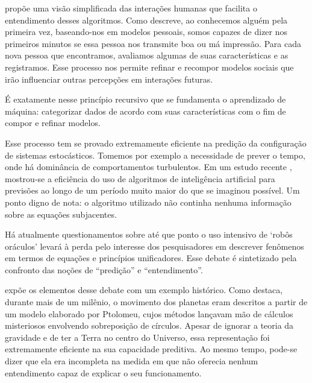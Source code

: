  propõe uma visão simplificada das interações humanas que facilita o entendimento desses algoritmos. Como descreve, ao conhecemos alguém pela primeira vez, baseando-nos em modelos pessoais, somos capazes de dizer nos primeiros minutos se essa pessoa nos transmite boa ou má impressão. Para cada nova pessoa que encontramos, avaliamos algumas de suas características e as registramos. Esse processo nos permite refinar e recompor modelos sociais que irão influenciar outras percepções em interações futuras. 

É exatamente nesse princípio recursivo que se fundamenta o aprendizado de máquina: categorizar dados de acordo com suas características com o fim de compor e refinar modelos.

Esse processo tem se provado extremamente eficiente na predição da configuração de sistemas estocásticos. Tomemos por exemplo a necessidade de prever o tempo, onde há dominância de comportamentos turbulentos. Em um estudo recente , mostrou-se a eficiência do uso de algoritmos de inteligência artificial para previsões ao longo de um período muito maior do que se imaginou possível. Um ponto digno de nota: o algoritmo utilizado não continha nenhuma informação sobre as equações subjacentes. 

Há atualmente questionamentos sobre até que ponto o uso intensivo de `robôs oráculos' levará à perda pelo interesse dos pesquisadores em descrever fenômenos em termos de equações e princípios unificadores. Esse debate é sintetizado pela confronto das noções de ``predição'' e ``entendimento''.

 expõe os elementos desse debate com um exemplo histórico. Como destaca, durante mais de um milênio, o movimento dos planetas eram descritos a partir de um modelo elaborado por Ptolomeu, cujos métodos lançavam mão de cálculos misteriosos envolvendo sobreposição de círculos. Apesar de ignorar a teoria da gravidade e de ter a Terra no centro do Universo, essa representação foi extremamente eficiente na sua capacidade preditiva. Ao mesmo tempo, pode-se dizer que ela era incompleta na medida em que não oferecia nenhum entendimento capaz de explicar o seu funcionamento.

